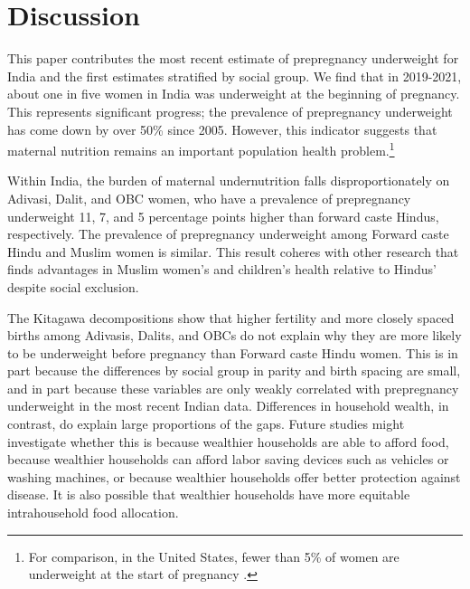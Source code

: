 \section{Discussion}

This paper contributes the most recent estimate of prepregnancy underweight for India and the first estimates stratified by social group. We find that in 2019-2021, about one in five women in India was underweight at the beginning of pregnancy. This represents significant progress; the prevalence of prepregnancy underweight has come down by over 50\% since 2005.  However, this indicator suggests that maternal nutrition remains an important population health problem.\footnote{For comparison, in the United States, fewer than 5\% of women are underweight at the start of pregnancy \citep{zong2022maternal}.} 

Within India, the burden of maternal undernutrition falls disproportionately on Adivasi, Dalit, and OBC women, who have a prevalence of prepregnancy underweight 11, 7, and 5 percentage points higher than forward caste Hindus, respectively.  The prevalence of prepregnancy underweight among Forward caste Hindu and Muslim women is similar.  This result coheres with other research that finds advantages in Muslim women's and children's health relative to Hindus' despite social exclusion.   

The Kitagawa decompositions show that higher fertility and more closely spaced births among Adivasis, Dalits, and OBCs do not explain why they are more likely to be underweight before pregnancy than Forward caste Hindu women.  This is in part because the differences by social group in parity and birth spacing are small, and in part because these variables are only weakly correlated with prepregnancy underweight in the most recent Indian data. Differences in household wealth, in contrast, do explain large proportions of the gaps.  Future studies might investigate whether this is because wealthier households are able to afford food, because wealthier households can afford labor saving devices such as vehicles or washing machines, or because wealthier households offer better protection against disease.  It is also possible that wealthier households have more equitable intrahousehold food allocation.

